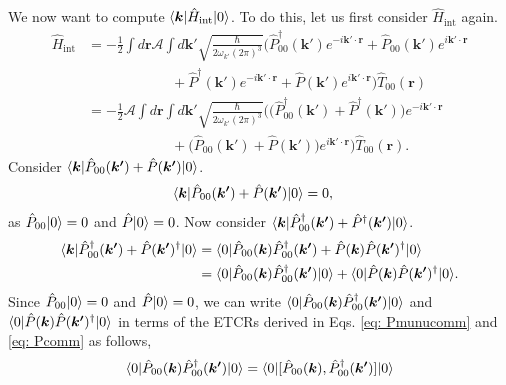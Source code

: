 \documentclass[12pt,a4paper]{report}
\theoremstyle{plain}
\theoremstyle{definition}
\theoremstyle{remark}
\renewcommand{\dag}{\dagger}
\newcommand{\Hint}{\hat{H}_{\text{int}}}
\DeclarePairedDelimiter\bra{\langle}{\rvert}
\DeclarePairedDelimiter\ket{\lvert}{\rangle}
\begin{document}
We now want to compute $\bra{\bm{k}}\Hint\ket{0}$. To do this, let us first consider $\Hint$ again.
\begin{equation}
    \begin{aligned}
        \Hint &= -\frac{1}{2} \int d{\bm{r}} \mathcal{A}\int d\bm{k'} \sqrt{\frac{\hbar}{2\omega_{k'} (2\pi)^3}}\Big(\hat{P}_{00}^{\dagger}(\bm{k'})e^{-i\bm{k'}\cdot\bm{r}} + \hat{P}_{00}(\bm{k'})e^{i\bm{k'}\cdot\bm{r}} \\ 
        &\qquad\qquad\qquad+ \hat{P}^{\dagger}(\bm{k'})e^{-i\bm{k'}\cdot\bm{r}} + \hat{P}(\bm{k'})e^{i\bm{k'}\cdot\bm{r}}\Big)\hat{T}_{00}(\bm{r})\\
        &= -\frac{1}{2} \mathcal{A} \int d{\bm{r}} \int d\bm{k'} \sqrt{\frac{\hbar}{2\omega_{k'} (2\pi)^3}} \Bigg(\Big(\hat{P}_{00}^{\dagger}(\bm{k'}) + \hat{P}^{\dagger}(\bm{k'})\Big)e^{-i\bm{k'}\cdot\bm{r}} \\
        &\qquad\qquad\qquad + \Big(\hat{P}_{00}(\bm{k'}) + \hat{P}(\bm{k'})\Big) e^{i\bm{k'}\cdot\bm{r}}\Bigg)\hat{T}_{00}(\bm{r}).
    \end{aligned}
\end{equation}
Consider $\bra{\bm{k}}\hat{P}_{00}(\bm{k'}) + \hat{P}(\bm{k'})\ket{0}$.
\begin{equation}
    \begin{aligned}
        \bra{\bm{k}}\hat{P}_{00}(\bm{k'}) + \hat{P}(\bm{k'})\ket{0} &= 0,
    \end{aligned}
\end{equation}
as $\hat{P}_{00}\ket{0} = 0$ and $\hat{P}\ket{0} = 0$.
Now consider $\bra{\bm{k}}\hat{P}_{00}^{\dag}(\bm{k'}) + \hat{P}^{\dag}(\bm{k'})\ket{0}$.
\begin{equation} \label{eq: KPStat}
    \begin{aligned}
        \bra{\bm{k}}\hat{P}_{00}^{\dag}(\bm{k'}) + \hat{P}(\bm{k'})^{\dag}\ket{0} &= \bra{0}\hat{P}_{00}(\bm{k})\hat{P}_{00}^{\dag}(\bm{k'}) + \hat{P}(\bm{k})\hat{P}(\bm{k'})^{\dag}\ket{0} \\
        &= \bra{0}\hat{P}_{00}(\bm{k})\hat{P}_{00}^{\dag}(\bm{k'})\ket{0} + \bra{0}\hat{P}(\bm{k})\hat{P}(\bm{k'})^{\dag}\ket{0}.
    \end{aligned}
\end{equation}
Since $\hat{P}_{00}\ket{0} = 0$ and $\hat{P}\ket{0} = 0$, we can write $\bra{0}\hat{P}_{00}(\bm{k})\hat{P}_{00}^{\dag}(\bm{k'})\ket{0}$ and $\bra{0}\hat{P}(\bm{k})\hat{P}(\bm{k'})^{\dag}\ket{0}$ in terms of the ETCRs derived in Eqs. \ref{eq: Pmunucomm} and \ref{eq: Pcomm} as follows,
\begin{equation}
    \bra{0}\hat{P}_{00}(\bm{k})\hat{P}_{00}^{\dag}(\bm{k'})\ket{0} = \bra{0}[\hat{P}_{00}(\bm{k}), \hat{P}_{00}^{\dag}(\bm{k'})]\ket{0}
\end{equation}
\end{document}
